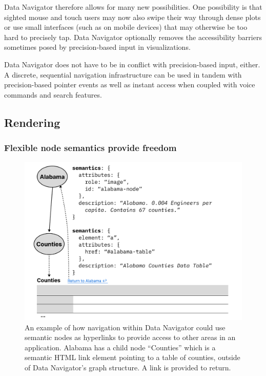 \documentclass[journal]{vgtc}                %
\begin{document}
Data Navigator therefore allows for many new possibilities. One possibility is that sighted mouse and touch users may now also swipe their way through dense plots or use small interfaces (such as on mobile devices) that may otherwise be too hard to precisely tap. Data Navigator optionally removes the accessibility barriers sometimes posed by precision-based input in visualizations.

Data Navigator does not have to be in conflict with precision-based input, either. A discrete, sequential navigation infrastructure can be used in tandem with precision-based pointer events as well as instant access when coupled with voice commands and search features.

\subsection{Rendering}

\subsubsection{Flexible node semantics provide freedom}

\begin{figure}[h]
  \centering
  \includegraphics[width=\linewidth]{figures/semantics.png}
  \caption{An example of how navigation within Data Navigator could use semantic nodes as hyperlinks to provide access to other areas in an application. Alabama has a child node ``Counties'' which is a semantic HTML link element pointing to a table of counties, outside of Data Navigator's graph structure. A link is provided to return.}
  \label{semantics}
\end{figure}
\end{document}
